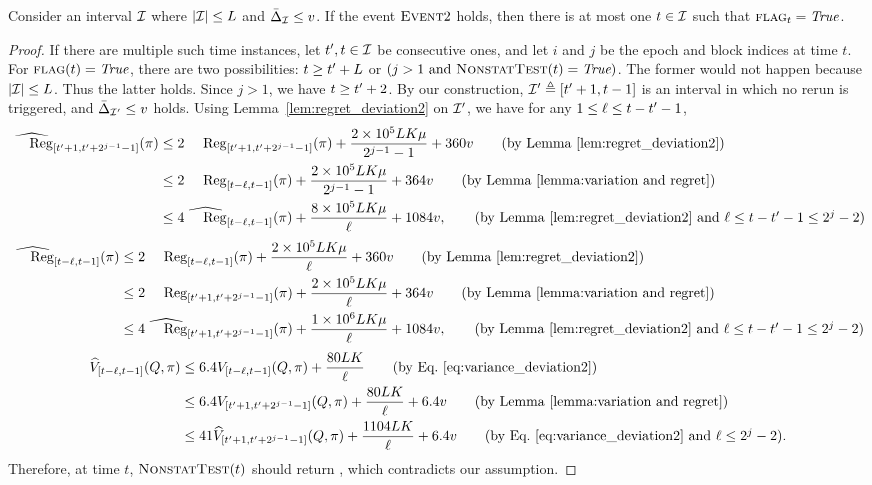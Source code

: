 \begin{lemma}
\label{lemma:at most one rerun ILTCB}
Consider an interval ${\mathcal{I}}$ where $\lvert{\mathcal{I}}\rvert\leq L$ and $\bar{\Delta}_{\mathcal{I}} \leq v$. If the event $\textsc{Event} 2$ holds, then there is at most one $t\in {\mathcal{I}}$ such that $\textsc{flag}_t=\textit{True}$.
\end{lemma}
\begin{proof}
If there are multiple such time instances, let $t^\prime, t\in {\mathcal{I}}$ be consecutive ones, and let $i$ and $j$ be the epoch and block indices at time $t$. For $\textsc{flag}(t)=\textit{True}$, there are two possibilities: $t\geq t^\prime+L$ or $(j>1 \text{ and }\textsc{NonstatTest}(t)=\textit{True})$. 
The former would not happen because $\lvert{\mathcal{I}}\rvert\leq L$. 
Thus the latter holds. Since $j>1$, we have $t\geq t^\prime+2$. 
By our construction, ${\mathcal{I}}^\prime\triangleq [t^\prime+1, t-1]$ is an interval in which no rerun is triggered, and $\bar{\Delta}_{{\mathcal{I}}^\prime}\leq v$ holds. 
Using Lemma~\ref{lem:regret_deviation2} on ${\mathcal{I}}^\prime$, we have for any $1\leq \ell\leq t-t^\prime-1$,
%
\begin{align*}
\whReg_{[t^\p+1, t^\p+2^{j-1}-1]}(\pi) &\leq 2\Reg_{[t^\p+1, t^\p+2^{j-1}-1]}(\pi) + \frac{2\times 10^5 LK\mu}{2^{j-1}-1} + 360 v
\tag{by Lemma~\ref{lem:regret_deviation2}} \\ 
&\leq 2\Reg_{[t-\ell, t-1]}(\pi) + \frac{2\times 10^5 LK\mu}{2^{j-1}-1} + 364v \tag{by Lemma~\ref{lemma:variation and regret}} \\ 
&\leq 4 \whReg_{[t-\ell, t-1]}(\pi) + \frac{8\times 10^5LK\mu}{\ell} + 1084v, \tag{by Lemma~\ref{lem:regret_deviation2} and $\ell\leq t-t^\p-1\leq 2^{j}-2$}
\end{align*}
%
\begin{align*}
\whReg_{[t-\ell, t-1]}(\pi) &\leq 2\Reg_{[t-\ell, t-1]}(\pi) + \frac{2\times 10^5 LK\mu}{\ell} + 360 v
\tag{by Lemma~\ref{lem:regret_deviation2}} \\ 
&\leq 2\Reg_{[t^\p+1, t^\p+2^{j-1}-1]}(\pi) + \frac{2\times 10^5 LK\mu}{\ell} + 364v \tag{by Lemma~\ref{lemma:variation and regret}} \\ 
&\leq 4 \whReg_{[t^\p+1, t^\p+2^{j-1}-1]}(\pi) + \frac{1\times 10^6LK\mu}{\ell} + 1084v, \tag{by Lemma~\ref{lem:regret_deviation2} and $\ell\leq t-t^\p-1\leq 2^{j}-2$}
\end{align*}
%
\begin{align*}
\whV_{[t-\ell, t-1]}(Q, \pi) &\leq 6.4V_{[t-\ell, t-1]}(Q, \pi)  + \frac{80
  LK}{\ell} \tag{by Eq.~\eqref{eq:variance_deviation2}} \\ 
&\leq 6.4V_{[t^\p+1, t^\p+2^{j-1}-1]}(Q, \pi)  + \frac{80
  LK}{\ell} + 6.4v \tag{by Lemma~\ref{lemma:variation and regret}} \\ 
&\leq 41 \whV_{[t^\p+1, t^\p+2^{j-1}-1]}(Q, \pi) + \frac{1104 LK}{\ell} + 6.4v\tag{by Eq.~\eqref{eq:variance_deviation2} and $\ell\leq 2^j-2$}. \\ 
\end{align*}
%
Therefore, at time $t$, $\textsc{NonstatTest}(t)$ should return \true, which contradicts our assumption.   
\end{proof}


